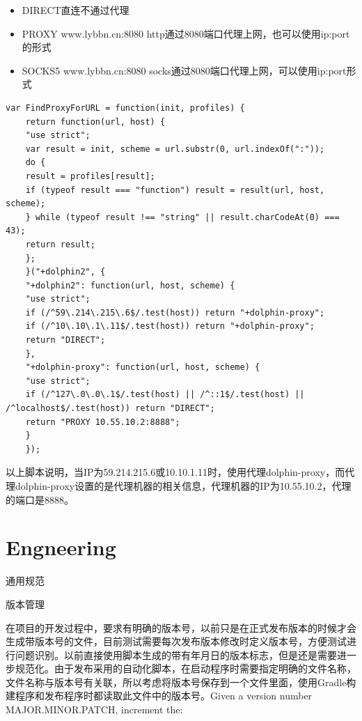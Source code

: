 \documentclass[11pt,fleqn]{book}
\makeatletter
\numberwithin{dummy}{section}
\theoremstyle{ocrenumbox}
\theoremstyle{blacknumex}
\theoremstyle{blacknumbox}
\theoremstyle{ocrenum}
\renewcommand{\section}{\@startsection{section}{1}{\z@}
	{-4ex \@plus -1ex \@minus -.4ex}
	{1ex \@plus.2ex }
	{\normalfont\large\sffamily\bfseries}}
\renewcommand{\subsection}{\@startsection {subsection}{2}{\z@}
	{-3ex \@plus -0.1ex \@minus -.4ex}
	{0.5ex \@plus.2ex }
	{\normalfont\sffamily\bfseries}}
\makeatother
\begin{document}
	\begin{itemize}
		\item{DIRECT直连不通过代理}
		\item{PROXY www.lybbn.cn:8080 http通过8080端口代理上网，也可以使用ip:port的形式}
		\item{SOCKS5 www.lybbn.cn:8080 socks通过8080端口代理上网，可以使用ip:port形式}
	\end{itemize}
	
	\begin{lstlisting}[language=VBScript]
	var FindProxyForURL = function(init, profiles) {
	return function(url, host) {
	"use strict";
	var result = init, scheme = url.substr(0, url.indexOf(":"));
	do {
	result = profiles[result];
	if (typeof result === "function") result = result(url, host, scheme);
	} while (typeof result !== "string" || result.charCodeAt(0) === 43);
	return result;
	};
	}("+dolphin2", {
	"+dolphin2": function(url, host, scheme) {
	"use strict";
	if (/^59\.214\.215\.6$/.test(host)) return "+dolphin-proxy";
	if (/^10\.10\.1\.11$/.test(host)) return "+dolphin-proxy";
	return "DIRECT";
	},
	"+dolphin-proxy": function(url, host, scheme) {
	"use strict";
	if (/^127\.0\.0\.1$/.test(host) || /^::1$/.test(host) || /^localhost$/.test(host)) return "DIRECT";
	return "PROXY 10.55.10.2:8888";
	}
	});
	\end{lstlisting}
	
	以上脚本说明，当IP为59.214.215.6或10.10.1.11时，使用代理dolphin-proxy，而代理dolphin-proxy设置的是代理机器的相关信息，代理机器的IP为10.55.10.2，代理的端口是8888。
	
	\part{Engneering}
	
	\section{通用规范}
	
	\subsection{版本管理}
	
	在项目的开发过程中，要求有明确的版本号，以前只是在正式发布版本的时候才会生成带版本号的文件，目前测试需要每次发布版本修改时定义版本号，方便测试进行问题识别。以前直接使用脚本生成的带有年月日的版本标志，但是还是需要进一步规范化。由于发布采用的自动化脚本，在启动程序时需要指定明确的文件名称，文件名称与版本号有关联，所以考虑将版本号保存到一个文件里面，使用Gradle构建程序和发布程序时都读取此文件中的版本号。Given a version number MAJOR.MINOR.PATCH, increment the:
	
\end{document}
